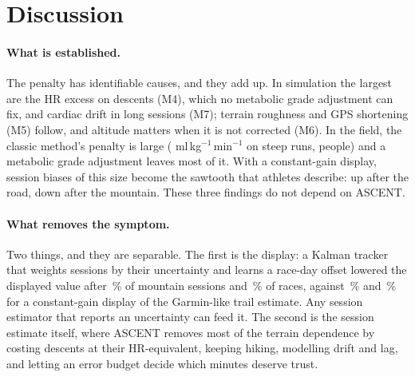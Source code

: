 \documentclass[11pt,a4paper]{article}
\newcommand{\unit}{ml\,kg$^{-1}$\,min$^{-1}$}
\newcommand{\ascent}{ASCENT}
\begin{document}
\section{Discussion}\label{sec:disc}

\paragraph{What is established.} The penalty has identifiable causes, and they add up. In simulation the largest are the HR excess on descents (M4), which no metabolic grade adjustment can fix, and cardiac drift in long sessions (M7); terrain roughness and GPS shortening (M5) follow, and altitude matters when it is not corrected (M6). In the field, the classic method's penalty is large (\nfrTrimDGflat{} \unit{} on steep runs, \nnFitrecRunners{} people) and a metabolic grade adjustment leaves most of it. With a constant-gain display, session biases of this size become the sawtooth that athletes describe: up after the road, down after the mountain. These three findings do not depend on \ascent.

\paragraph{What removes the symptom.} Two things, and they are separable. The first is the display: a Kalman tracker that weights sessions by their uncertainty and learns a race-day offset lowered the displayed value after \nlongDropMtnRace\,\% of mountain sessions and \nlongDropRaceRace\,\% of races, against \nlongDropMtnGarmin\,\% and \nlongDropRaceGarmin\,\% for a constant-gain display of the Garmin-like trail estimate. Any session estimator that reports an uncertainty can feed it. The second is the session estimate itself, where \ascent{} removes most of the terrain dependence by costing descents at their HR-equivalent, keeping hiking, modelling drift and lag, and letting an error budget decide which minutes deserve trust.
\end{document}
